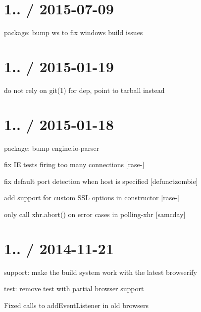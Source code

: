 \section*{1.. / 2015-\/07-\/09 }


\begin{DoxyItemize}
\item package\+: bump {\ttfamily ws} to fix windows build issues
\end{DoxyItemize}

\section*{1.. / 2015-\/01-\/19 }


\begin{DoxyItemize}
\item do not rely on {\ttfamily git(1)} for dep, point to tarball instead
\end{DoxyItemize}

\section*{1.. / 2015-\/01-\/18 }


\begin{DoxyItemize}
\item package\+: bump {\ttfamily engine.\+io-\/parser}
\item fix IE tests firing too many connections \mbox{[}rase-\/\mbox{]}
\item fix default port detection when host is specified \mbox{[}defunctzombie\mbox{]}
\item add support for custom S\+SL options in constructor \mbox{[}rase-\/\mbox{]}
\item only call xhr.\+abort() on error cases in {\ttfamily polling-\/xhr} \mbox{[}samcday\mbox{]}
\end{DoxyItemize}

\section*{1.. / 2014-\/11-\/21 }


\begin{DoxyItemize}
\item support\+: make the build system work with the latest browserify
\item test\+: remove test with partial browser support
\item Fixed calls to add\+Event\+Listener in old browsers
\end{DoxyItemize}

